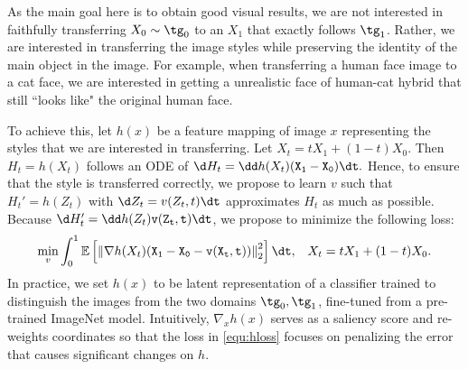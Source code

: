 \documentclass[11pt]{article}
\newcommand{\norm}[1]{\left\|#1\right\|}
\begin{document}
As the main goal here is to obtain good visual results,  
we are not interested in faithfully transferring $X_0\sim \tg_0$  
to an $X_1$ that exactly follows $\tg_1$. 
Rather, we are interested in 
transferring the image styles while preserving the identity of the main object in the image. For example, 
when transferring a human face image to a cat face, 
we are interested in getting a unrealistic face of human-cat hybrid that still ``looks like" the original human face.

To achieve this, 
let $h(x)$ be a feature mapping of image $x$ representing the styles that we are interested in transferring. 
Let $X_t = t X_1 + (1-t) X_0$. Then $H_t = h(X_t)$ follows an ODE of $\d H_t = \dd h(X_t)\tt (X_1-X_0)\dt .$ Hence, to ensure that the style is transferred correctly, 
we propose to %
learn $v$ such that $H_t' = h(Z_t)$ with $\d Z_t  = v(Z_t,t)\dt $ approximates $H_t$ as much as possible. 
Because $\d H_t' = \dd h(Z_t) \tt v(Z_t, t)\dt$, we propose to minimize the following loss: 
\begin{align}\label{equ:hloss}
    \min_v \int_0^1\mathbb{E} \left[ \norm{ \nabla h(X_t)\tt (X_1 - X_0 - v (X_t, t)) }_2^2 \right ] \dt , && X_t = t X_1 + (1 - t) X_0. 
\end{align}
In practice, we set $h(x)$ to be latent representation of a classifier trained 
to distinguish the images from the two domains $\tg_0,\tg_1$, fine-tuned from a pre-trained ImageNet \citep{tan2019efficientnet} model. %
Intuitively, $\nabla_x h(x)$ serves as a saliency score and re-weights coordinates so that the loss in \eqref{equ:hloss} focuses on penalizing the error that causes significant changes on $h$. 
\end{document}
